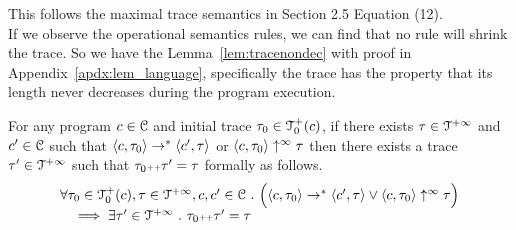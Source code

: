 %
This follows the maximal trace semantics in \cite{cousot2019abstract} Section 2.5 Equation (12).
\\
If we observe the operational semantics rules, we can find that no rule will shrink the trace. 
So we have the Lemma~\ref{lem:tracenondec} with proof in Appendix~\ref{apdx:lem_language}, 
specifically the trace has the property that its length never decreases during the program execution.
\begin{lem}
  \label{lem:tracenondec}
  For any program $c \in \mathcal{C}$ and initial trace $\mathtt{\tau}_0 \in \mathcal{T}^{+}_0(c)$,
  if there exists $\mathtt{\tau} \in \mathcal{T}^{+\infty}$ and $c' \in \mathcal{C} $ such that $\langle c, \mathtt{\tau}_0 \rangle \rightarrow^{*} \langle c', \mathtt{\tau} \rangle $ or 
  $\langle c, \mathtt{\tau}_0 \rangle \uparrow^{\infty} \mathtt{\tau}$  
  then there exists a trace $\mathtt{\tau}' \in \mathcal{T}^{+\infty}$ such that $\mathtt{\tau}_0 {\scriptscriptstyle ++} \mathtt{\tau}' = \mathtt{\tau}$ formally as follows.
  \[
    \begin{array}{l}
    \forall \mathtt{\tau}_0 \in \mathcal{T}^{+}_0(c), \mathtt{\tau} \in \mathcal{T}^{+\infty}, c, c' \in \mathcal{C} ~.~
    \Big( \langle c, \mathtt{\tau}_0 \rangle \rightarrow^{*} \langle c', \mathtt{\tau} \rangle 
    \lor  \langle c, \mathtt{\tau}_0 \rangle \uparrow^{\infty} \mathtt{\tau} \Big)
    \\ \quad
    \implies \exists \mathtt{\tau}' \in \mathcal{T}^{+\infty} ~.~ \mathtt{\tau}_0 {\scriptscriptstyle ++} \mathtt{\tau}' = \mathtt{\tau} 
    \end{array}
    \]
  \end{lem}